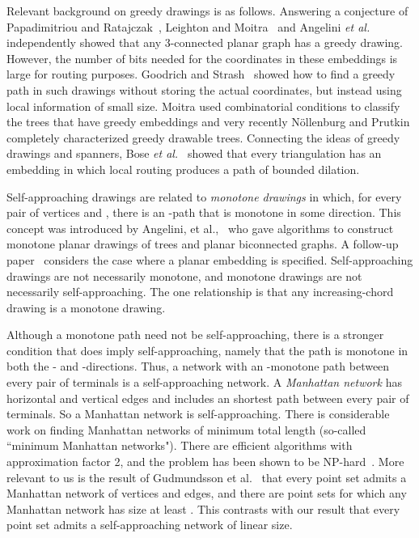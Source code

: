 \documentclass[11pt]{article}
\newcommand{\etal}{{\em et al.~}}
\newcommand{\changed}[1]{#1}
\newcommand{\changeS}[1]{{#1}}
\newcommand{\changeSH}[1]{{#1}}
\begin{document}
Relevant background on greedy drawings is as follows.
Answering a conjecture of Papadimitriou and Ratajczak~\cite{Papadimitriou:2005}, Leighton and Moitra~\cite{Leighton:2010}
\changeS{and Angelini \etal\cite{Angelini:2009} independently showed that any 3-connected planar graph has a greedy drawing. However, the number of bits needed for the coordinates in these embeddings is large for routing purposes. Goodrich and Strash~\cite{Goodrich:2008} showed how to find a greedy path in such drawings without storing the actual coordinates, but instead using local information of small size.}
Moitra \cite{Moitra:Thesis:2009} used combinatorial conditions to classify the trees that have greedy embeddings and \changeSH{very recently N{\"o}llenburg and Prutkin \cite{Nollenburg:2013} completely characterized greedy drawable trees.}
Connecting the ideas of greedy drawings and spanners,
Bose \etal\cite{Bose:theta6:2012} showed that every triangulation has an embedding in which local routing produces a path of bounded dilation.

Self-approaching drawings are related to \emph{monotone drawings} in which, for every pair of vertices  and ,  there is an -path that is monotone in some direction.  This concept was introduced by Angelini, et al.,~\cite{Angelini:MonoDraw:2012} who
gave algorithms to construct monotone planar drawings of trees and planar biconnected graphs.   A follow-up paper~\cite{Angelini:MonoFixed:2011} considers the case where a planar embedding is specified.  Self-approaching drawings are not necessarily monotone, and monotone drawings are not necessarily self-approaching.   The one relationship is that any increasing-chord drawing is  a monotone drawing.




Although a monotone path need not be self-approaching, there is a stronger condition that does imply self-approaching, namely that
the path is monotone in both the - and -directions.
Thus, a network with an -monotone path between every pair of terminals is a self-approaching network.  A \emph{Manhattan network} has horizontal and vertical edges and includes an  shortest path between every pair of terminals.   So a Manhattan network is self-approaching.
There is considerable work on finding Manhattan networks of minimum total length (so-called ``minimum Manhattan networks").  There are efficient algorithms with approximation factor 2, and the problem has been shown to be NP-hard~\cite{Chin:MMN-NP-complete:2011}.
More relevant to us is the result of Gudmundsson et al.~\cite{Gudmundsson:smallManhattan:2007} that every point set admits a Manhattan network of  vertices and edges, and there are point sets for which any Manhattan network has size at least .
{\changed This contrasts with our result that every point set admits a self-approaching network of linear size.}
\end{document}

